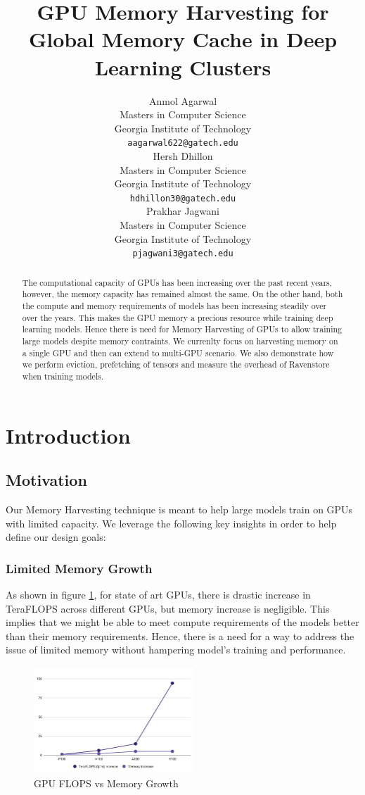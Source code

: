 \documentclass{article}
\title{GPU Memory Harvesting for Global Memory Cache in Deep Learning Clusters}
\author{Anmol Agarwal \\
	Masters in Computer Science\\
	Georgia Institute of Technology\\
	\texttt{aagarwal622@gatech.edu} \\
	\And
	Hersh Dhillon \\
	Masters in Computer Science\\
	Georgia Institute of Technology\\
	\texttt{hdhillon30@gatech.edu} \\
	\And
	Prakhar Jagwani \\
	Masters in Computer Science\\
	Georgia Institute of Technology\\
	\texttt{pjagwani3@gatech.edu} \\
}
\begin{document}
\maketitle

\begin{abstract}
The computational capacity of GPUs has been increasing over the past recent years, however, the memory capacity
has remained almost the same. On the other hand, both the compute and memory requirements of
models has been increasing steadily over over the years. This makes the GPU memory a 
precious resource while training deep learning models. Hence there is need for 
Memory Harvesting of GPUs to allow training large models despite memory contraints. We
currenlty focus on harvesting memory on a single GPU and then can extend to multi-GPU scenario.
We also demonstrate how we perform eviction, prefetching of tensors and measure the overhead
of Ravenstore when training models.
\end{abstract}




\section{Introduction}
\subsection{Motivation}
Our Memory Harvesting technique is meant to help large models train on GPUs with limited capacity.
We leverage the following key insights in order to help define our design goals:
	\subsubsection{Limited Memory Growth}As shown in figure \ref{fig1}, for state of 
	art GPUs, there is drastic increase in TeraFLOPS across different GPUs, but memory increase is negligible.
	This implies that we might be able to meet compute requirements of the models better than their memory requirements.
	Hence, there is a need for a way to address the issue of limited memory without hampering model's training and performance.
	\begin{figure}[!htbp]
		\centering
		\includegraphics[height=4cm, width=6cm]{figures/teraflops.png}
		\caption{GPU FLOPS vs Memory Growth}
		\label{fig1}
	\end{figure}
\end{document}
